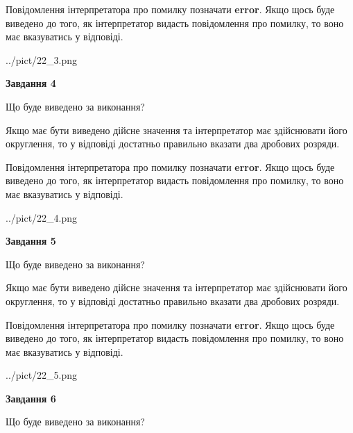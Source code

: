 \documentclass[12pt, ukrainian]{article}
\begin{document}
{\begin {Large}
Повідомлення інтерпретатора про помилку позначати \textbf{error}.
Якщо щось буде виведено до того, як інтерпретатор видасть повідомлення про помилку, 
то воно має вказуватись у відповіді. \par

\begin{center}
	{../pict/22_3.png}
\end{center}
\newpage

{\begin {center}\textbf{Завдання 4}\end {center}}\par
Що буде виведено за виконання? \par

Якщо має бути виведено дійсне значення та інтерпретатор має здійснювати його округлення, 
то у відповіді достатньо правильно вказати два дробових розряди.

Повідомлення інтерпретатора про помилку позначати \textbf{error}.
Якщо щось буде виведено до того, як інтерпретатор видасть повідомлення про помилку, 
то воно має вказуватись у відповіді. \par

\begin{center}
	{../pict/22_4.png}
\end{center}
\newpage

{\begin {center}\textbf{Завдання 5}\end {center}}\par
Що буде виведено за виконання? \par

Якщо має бути виведено дійсне значення та інтерпретатор має здійснювати його округлення, 
то у відповіді достатньо правильно вказати два дробових розряди.

Повідомлення інтерпретатора про помилку позначати \textbf{error}.
Якщо щось буде виведено до того, як інтерпретатор видасть повідомлення про помилку, 
то воно має вказуватись у відповіді. \par

\begin{center}
	{../pict/22_5.png}
\end{center}
\newpage

{\begin {center}\textbf{Завдання 6}\end {center}}\par
Що буде виведено за виконання? \par


\end{Large}}
\end{document}
